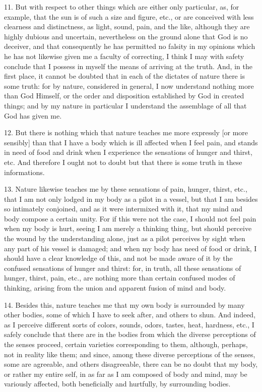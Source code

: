 11. But with respect to other things which are either only particular, as, for example, that the sun is of such a size and figure, etc., or are conceived with less clearness and distinctness, as light, sound, pain, and the like, although they are highly dubious and uncertain, nevertheless on the ground alone that God is no deceiver, and that consequently he has permitted no falsity in my opinions which he has not likewise given me a faculty of correcting, I think I may with safety conclude that I possess in myself the means of arriving at the truth. And, in the first place, it cannot be doubted that in each of the dictates of nature there is some truth: for by nature, considered in general, I now understand nothing more than God Himself, or the order and disposition established by God in created things; and by my nature in particular I understand the assemblage of all that God has given me.

12. But there is nothing which that nature teaches me more expressly [or more sensibly] than that I have a body which is ill affected when I feel pain, and stands in need of food and drink when I experience the sensations of hunger and thirst, etc. And therefore I ought not to doubt but that there is some truth in these informations.

13. Nature likewise teaches me by these sensations of pain, hunger, thirst, etc., that I am not only lodged in my body as a pilot in a vessel, but that I am besides so intimately conjoined, and as it were intermixed with it, that my mind and body compose a certain unity. For if this were not the case, I should not feel pain when my body is hurt, seeing I am merely a thinking thing, but should perceive the wound by the understanding alone, just as a pilot perceives by sight when any part of his vessel is damaged; and when my body has need of food or drink, I should have a clear knowledge of this, and not be made aware of it by the confused sensations of hunger and thirst: for, in truth, all these sensations of hunger, thirst, pain, etc., are nothing more than certain confused modes of thinking, arising from the union and apparent fusion of mind and body.

14. Besides this, nature teaches me that my own body is surrounded by many other bodies, some of which I have to seek after, and others to shun. And indeed, as I perceive different sorts of colors, sounds, odors, tastes, heat, hardness, etc., I safely conclude that there are in the bodies from which the diverse perceptions of the senses proceed, certain varieties corresponding to them, although, perhaps, not in reality like them; and since, among these diverse perceptions of the senses, some are agreeable, and others disagreeable, there can be no doubt that my body, or rather my entire self, in as far as I am composed of body and mind, may be variously affected, both beneficially and hurtfully, by surrounding bodies.

